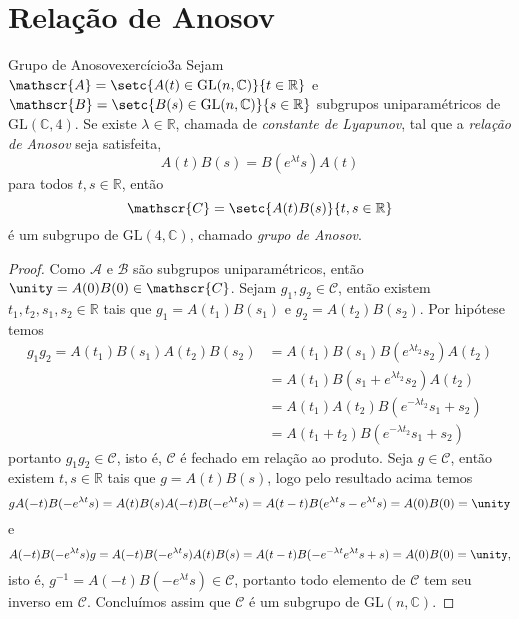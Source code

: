 \section{Relação de Anosov}
\begin{proposition}{Grupo de Anosov}{exercício3a}
    Sejam \(\mathscr{A} = \setc{A(t) \in \mathrm{GL}(n,\mathbb{C})}{t \in \mathbb{R}}\) e \(\mathscr{B} = \setc{B(s) \in \mathrm{GL}(n,\mathbb{C})}{s \in \mathbb{R}}\) subgrupos uniparamétricos de \(\mathrm{GL}(\mathbb{C}, 4)\). Se existe \(\lambda \in \mathbb{R}\), chamada de \emph{constante de Lyapunov}, tal que a \emph{relação de Anosov} seja satisfeita,
    \begin{equation*}
        A(t) B(s) = B(e^{\lambda t}s) A(t)
    \end{equation*}
    para todos \(t, s \in \mathbb{R}\), então
    \begin{equation*}
        \mathscr{C} = \setc{A(t) B(s)}{t, s \in \mathbb{R}}
    \end{equation*}
    é um subgrupo de \(\mathrm{GL}(4, \mathbb{C})\), chamado \emph{grupo de Anosov}.
\end{proposition}
\begin{proof}
    Como \(\mathscr{A}\) e \(\mathscr{B}\) são subgrupos uniparamétricos, então \(\unity = A(0)B(0) \in \mathscr{C}\). Sejam \(g_1, g_2 \in \mathscr{C}\), então existem \(t_1, t_2, s_1, s_2 \in \mathbb{R}\) tais que \(g_1 = A(t_1)B(s_1)\) e \(g_2 = A(t_2)B(s_2)\). Por hipótese temos
    \begin{align*}
        g_1 g_2 = A(t_1)B(s_1)A(t_2) B(s_2) &= A(t_1) B(s_1) B(e^{\lambda t_2}s_2) A(t_2)\\
                                            &= A(t_1) B(s_1 + e^{\lambda t_2}s_2)  A(t_2)\\
                                            &= A(t_1) A(t_2) B(e^{-\lambda t_2}s_1 + s_2)\\
                                            &= A(t_1 + t_2) B(e^{-\lambda t_2}s_1 + s_2)
    \end{align*}
    portanto \(g_1 g_2 \in \mathscr{C}\), isto é, \(\mathscr{C}\) é fechado em relação ao produto. Seja \(g \in \mathscr{C}\), então existem \(t, s \in \mathbb{R}\) tais que \(g = A(t) B(s)\), logo pelo resultado acima temos
    \begin{equation*}
        g A(-t)B(-e^{\lambda t}s) = A(t)B(s) A(-t)B(-e^{\lambda t}s) = A(t - t) B(e^{\lambda t}s - e^{\lambda t}s) = A(0)B(0) = \unity
    \end{equation*}
    e
    \begin{equation*}
        A(-t)B(-e^{\lambda t}s)g = A(-t)B(-e^{\lambda t}s)A(t) B(s) = A(t-t)B(-e^{-\lambda t}e^{\lambda t}s + s) = A(0)B(0) = \unity,
    \end{equation*}
    isto é, \(g^{-1} = A(-t)B(-e^{\lambda t}s) \in \mathscr{C}\), portanto todo elemento de \(\mathscr{C}\) tem seu inverso em \(\mathscr{C}\). Concluímos assim que \(\mathscr{C}\) é um subgrupo de \(\mathrm{GL}(n,\mathbb{C})\).
\end{proof}

